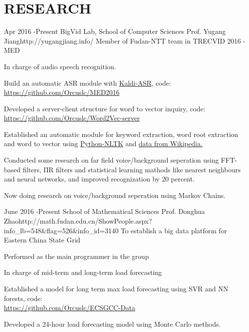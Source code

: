 \documentclass[10pt]{article} %
\begin{document}
\section{RESEARCH}
\research
{Apr 2016 -}{Present}
{BigVid Lab, School of Computer Sciences}
{Prof. Yugang Jiang}{http://yugangjiang.info/}
{Member of Fudan-NTT team in TRECVID 2016 - MED}
{
\begin{itemize-noindent} \itemsep -2pt
\item{In charge of audio speech recognition.}
\item{Build an automatic ASR module with \href{http://kaldi-asr.org}{Kaldi-ASR}, code:\\\href{https://github.com/Orcuslc/MED2016}{https://github.com/Orcuslc/MED2016}}
\item{Developed a server-client structure for word to vector inquiry, code:\\\href{https://github.com/Orcuslc/Word2Vec-server}{https://github.com/Orcuslc/Word2Vec-server}}
\item{Established an automatic module for keyword extraction, word root extraction and word to vector using \href{http://www.nltk.org/}{Python-NLTK} and \href{http://nlp.stanford.edu/projects/glove/}{data from Wikipedia.}}
\item{Conducted some research on far field voice/background seperation using FFT-based filters, IIR filters and statistical learning mathods like nearest neighbours and neural networks, and improved recognization by 20 percent.}
\item{Now doing research on voice/background seperation using Markov Chains.}
\end{itemize-noindent}
}

\research
{June 2016 -}{Present}
{School of Mathematical Sciences}
{Prof. Donghua Zhao}{http://math.fudan.edu.cn/ShowPeople.aspx?info_lb=548&flag=526&info_id=3140}
{To establish a big data platform for Eastern China State Grid}
{
\begin{itemize-noindent} \itemsep -2pt
\item{Performed as the main programmer in the group}
\item{In charge of mid-term and long-term load forecasting}
\item{Established a model for long term max load forecasting using SVR and NN forests, code:\\ \href{https://github.com/Orcuslc/ECSGCC-Data}{https://github.com/Orcuslc/ECSGCC-Data}}
\item{Developed a 24-hour load forecasting model using Monte Carlo methods.}
\end{itemize-noindent}
}
\end{document}
